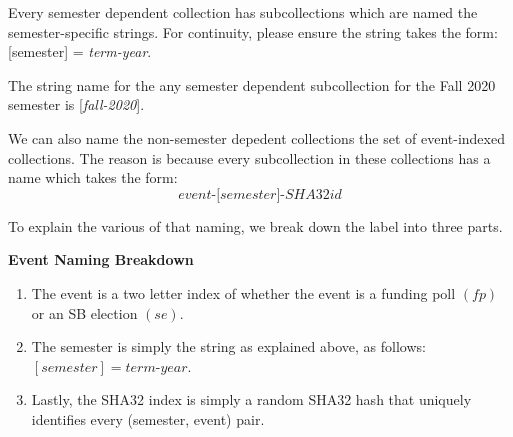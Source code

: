 \documentclass[a4paper]{article}
\begin{document}
%

\begin{note*}
Every semester dependent collection has subcollections which are named the semester-specific strings. For continuity, please ensure the string takes the form: [semester] = \textit{term-year}.
\end{note*}

\begin{example*}
The string name for the any semester dependent subcollection for the Fall 2020 semester is [\textit{fall-2020}].
\end{example*}

%

\begin{note*} We can also name the non-semester depedent collections the set of event-indexed collections. The reason is because every subcollection in these collections has a name which takes the form:
$$\textit{event-[semester]-SHA32id}$$
\end{note*}

\noindent To explain the various of that naming, we break down the label into three parts.

\begin{center}
\textbf{Event Naming Breakdown}
\end{center}
\begin{enumerate}
  \item The event is a two letter index of whether the event is a funding poll $(fp)$ or an SB election $(se)$.
  \item The semester is simply the string as explained above, as follows: $[semester] = \textit{term-year}$.
  \item Lastly, the SHA32 index is simply a random SHA32 hash that uniquely identifies every (semester, event) pair.
\end{enumerate}
\end{document}

